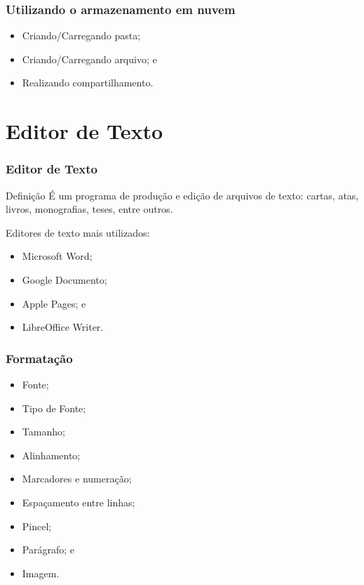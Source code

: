 \documentclass[aspectratio=169]{beamer} %
\begin{document}
\begin{frame}
	\frametitle{Utilizando o armazenamento em nuvem}
	
	\begin{itemize}
		\item Criando/Carregando pasta;
		\item Criando/Carregando arquivo; e
		\item Realizando compartilhamento.
	\end{itemize}
\end{frame}

\section{Editor de Texto}

\begin{frame}
	\frametitle{Editor de Texto}
	
	\begin{block}{Defini\c cão}
		É um programa de produ\c cão e edição de arquivos de texto: cartas, atas,  livros, monografias, teses,  entre outros.
	\end{block} \vfill
		
	Editores de texto mais utilizados:
	\begin{itemize}
		\item Microsoft Word;
		\item Google Documento;
		\item Apple Pages; e
		\item LibreOffice Writer.
	\end{itemize}
\end{frame}

\begin{frame}
	\frametitle{Formata\c cão}
			
	\begin{itemize}
		\item Fonte;
		\item Tipo de Fonte; 
		\item Tamanho; 
		\item Alinhamento;
		\item Marcadores e numera\c cão;
		\item Espa\c camento entre linhas;
		\item Pincel;
		\item Parágrafo; e
		\item Imagem.
	\end{itemize}
\end{frame}
\end{document}
